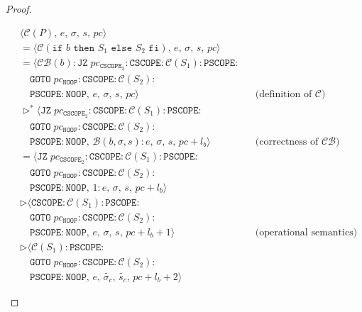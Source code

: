 \documentclass{article}
\begin{document}
\begin{proof}
\begin{itemize}
\begin{itemize}
            \[
              \begin{aligned}
              &\langle \mathcal{C}(P),\, e,\, \sigma,\, s,\, pc \rangle \\
              &= \langle \mathcal{C}(\texttt{if } b \texttt{ then } S_1 \texttt{ else } S_2 \texttt{ fi}),\, e,\, \sigma,\, s,\, pc \rangle \\
              &= \langle \mathcal{CB}(b) : \texttt{JZ}\; pc_{\texttt{CSCOPE}_2} : \texttt{CSCOPE} : \mathcal{C}(S_1) : \texttt{PSCOPE} : \\
              &\quad \texttt{GOTO}\; pc_{\texttt{NOOP}} : \texttt{CSCOPE} : \mathcal{C}(S_2) : \\
              &\quad \texttt{PSCOPE} : \texttt{NOOP} ,\, e,\, \sigma,\, s,\, pc \rangle
              && \text{(definition of } \mathcal{C}\text{)} \\
              &\triangleright^\ast \langle \texttt{JZ}\; pc_{\texttt{CSCOPE}_2} : \texttt{CSCOPE} : \mathcal{C}(S_1) : \texttt{PSCOPE} : \\
              &\quad \texttt{GOTO}\; pc_{\texttt{NOOP}} : \texttt{CSCOPE} : \mathcal{C}(S_2) : \\
              &\quad \texttt{PSCOPE} : \texttt{NOOP} ,\, \mathcal{B}(b, \sigma, s) : e,\, \sigma,\, s,\, pc + l_b \rangle
              && \text{(correctness of } \mathcal{CB}\text{)} \\
              &= \langle \texttt{JZ}\; pc_{\texttt{CSCOPE}_2} : \texttt{CSCOPE} : \mathcal{C}(S_1) : \texttt{PSCOPE} : \\
              &\quad \texttt{GOTO}\; pc_{\texttt{NOOP}} : \texttt{CSCOPE} : \mathcal{C}(S_2) : \\
              &\quad \texttt{PSCOPE} : \texttt{NOOP},\, 1 : e,\, \sigma,\, s,\, pc + l_b \rangle \\
              &\triangleright \langle \texttt{CSCOPE} : \mathcal{C}(S_1) : \texttt{PSCOPE} : \\
              &\quad \texttt{GOTO}\; pc_{\texttt{NOOP}} : \texttt{CSCOPE} : \mathcal{C}(S_2) : \\
              &\quad \texttt{PSCOPE} : \texttt{NOOP},\, e,\, \sigma,\, s,\, pc + l_b + 1 \rangle
              && \text{(operational semantics)} \\
              &\triangleright \langle \mathcal{C}(S_1) : \texttt{PSCOPE} : \\
              &\quad \texttt{GOTO}\; pc_{\texttt{NOOP}} : \texttt{CSCOPE} : \mathcal{C}(S_2) : \\
              &\quad \texttt{PSCOPE} : \texttt{NOOP},\, e,\, \tilde{\sigma_c},\, \tilde{s_c},\, pc + l_b + 2 \rangle

\end{aligned}\]
\end{itemize}
\end{itemize}
\end{proof}
\end{document}
